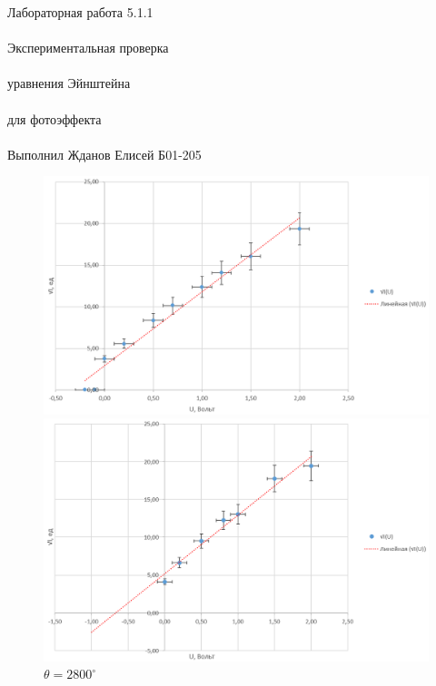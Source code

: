\documentclass{astroedu-lab}
\begin{document}
\begin{problem}{\huge Лабораторная работа 5.1.1\\\\Экспериментальная проверка\\\\ уравнения Эйнштейна\\\\
для фотоэффекта\\\\Выполнил Жданов Елисей Б01-205}
\begin{figure}[h!]
    \centering
    \begin{minipage}[b]{0.48\textwidth}
        \centering
        \includegraphics[width=\textwidth]{p/2024-09-29_01-12-10.png}
        \caption{$\theta = 2874^\circ$}
        \label{fig:9}
    \end{minipage}
    \hfill
    \begin{minipage}[b]{0.48\textwidth}
        \centering
        \includegraphics[width=\textwidth]{p/2024-09-29_01-15-03.png}
        \caption{$\theta = 2800^\circ$}
        \label{fig:10}
    \end{minipage}
    \hfill
    \begin{minipage}[b]{0.48\textwidth}
        \centering

\end{minipage}
\end{figure}
\end{problem}
\end{document}
